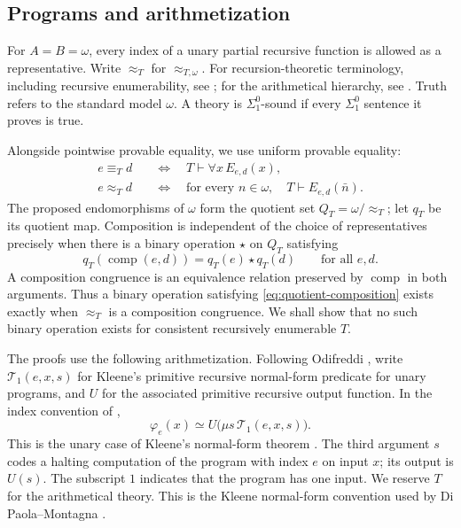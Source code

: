 \documentclass[11pt]{article}
\newcommand{\comp}{\operatorname{comp}}
\begin{document}
\subsection{Programs and arithmetization}\label{sec:arithmetization}

For $A=B=\omega$, every index of a unary partial recursive function is
allowed as a representative. Write $\approx_T$ for
$\approx_{T,\omega}$.
For recursion-theoretic terminology, including recursive enumerability,
see \cite{Rogers,Odifreddi}; for the arithmetical hierarchy, see
\cite[Definition~IV.1.6, p.~367]{Odifreddi}.
Truth refers to the standard model $\omega$.
A theory is $\Sigma^0_1$-sound if every $\Sigma^0_1$ sentence it proves
is true.

Alongside pointwise provable equality, we use uniform provable equality:
\begin{align}
 e\equiv_T d
 &\quad\Longleftrightarrow\quad T\vdash\forall x\,E_{e,d}(x),
 \label{eq:uniform}\\
 e\approx_T d
 &\quad\Longleftrightarrow\quad
 \text{for every }n\in\omega,\quad T\vdash E_{e,d}(\bar n).
 \label{eq:pointwise}
\end{align}
The proposed endomorphisms of $\omega$ form the quotient set
$Q_T=\omega/{\approx_T}$; let $q_T$ be its quotient map.
Composition is independent of the choice of representatives precisely
when there is a binary operation $\star$ on $Q_T$ satisfying
\begin{equation}\label{eq:quotient-composition}
 q_T(\comp(e,d))=q_T(e)\star q_T(d)
 \qquad\text{for all }e,d.
\end{equation}
A composition congruence is an equivalence relation preserved by
$\comp$ in both arguments. Thus a binary operation satisfying
\eqref{eq:quotient-composition} exists exactly when $\approx_T$ is a
composition congruence.
We shall show that no such binary operation exists for consistent
recursively enumerable $T$.

The proofs use the following arithmetization.
Following Odifreddi
\cite[Theorem~II.1.2, p.~129]{Odifreddi}, write $\mathcal{T}_1(e,x,s)$ for Kleene's
primitive recursive normal-form predicate for unary programs, and $U$
for the associated primitive recursive output function.
In the index convention of \cite[Definition~II.1.4, p.~130]{Odifreddi},
\[
 \varphi_e(x)\simeq U\bigl(\mu s\,\mathcal{T}_1(e,x,s)\bigr).
\]
This is the unary case of Kleene's normal-form theorem
\cite[\S63, Theorem~XIX(a), p.~330]{Kleene}.
The third argument $s$ codes a halting computation of the program with
index $e$ on input $x$; its output is $U(s)$.
The subscript $1$ indicates that the program has one input.
We reserve $T$ for the arithmetical theory.
This is the
Kleene normal-form convention used by Di Paola--Montagna
\cite[p.~645]{DiPaolaMontagna}.
\end{document}
